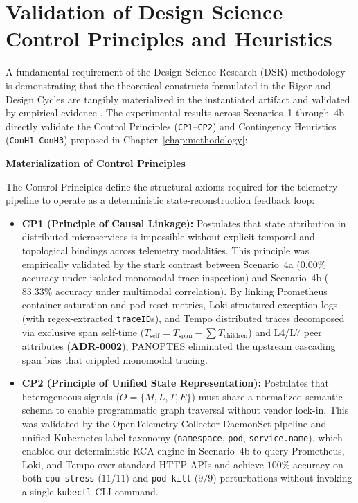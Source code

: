 \section{Validation of Design Science Control Principles and Heuristics}
\label{sec:dsr-validation}

A fundamental requirement of the Design Science Research (DSR) methodology is demonstrating that the theoretical constructs formulated in the Rigor and Design Cycles are tangibly materialized in the instantiated artifact and validated by empirical evidence \cite{hevner_2004, gregor_2013}. The experimental results across Scenarios~1 through~4b directly validate the Control Principles (\texttt{CP1}--\texttt{CP2}) and Contingency Heuristics (\texttt{ConH1}--\texttt{ConH3}) proposed in Chapter~\ref{chap:methodology}:

\textbf{Materialization of Control Principles}

The Control Principles define the structural axioms required for the telemetry pipeline to operate as a deterministic state-reconstruction feedback loop:

\begin{itemize}
    \item \textbf{CP1 (Principle of Causal Linkage):} Postulates that state attribution in distributed microservices is impossible without explicit temporal and topological bindings across telemetry modalities. This principle was empirically validated by the stark contrast between Scenario~4a ($0.00\%$ accuracy under isolated monomodal trace inspection) and Scenario~4b ($83.33\%$ accuracy under multimodal correlation). By linking Prometheus container saturation and pod-reset metrics, Loki structured exception logs (with regex-extracted \texttt{traceID}s), and Tempo distributed traces decomposed via exclusive span self-time ($T_{\text{self}} = T_{\text{span}} - \sum T_{\text{children}}$) and L4/L7 peer attributes (\textbf{ADR-0002}), PANOPTES eliminated the upstream cascading span bias that crippled monomodal tracing.
    
    \item \textbf{CP2 (Principle of Unified State Representation):} Postulates that heterogeneous signals ($O = \{M, L, T, E\}$) must share a normalized semantic schema to enable programmatic graph traversal without vendor lock-in. This was validated by the OpenTelemetry Collector DaemonSet pipeline and unified Kubernetes label taxonomy (\texttt{namespace}, \texttt{pod}, \texttt{service.name}), which enabled our deterministic RCA engine in Scenario~4b to query Prometheus, Loki, and Tempo over standard HTTP APIs and achieve $100\%$ accuracy on both \texttt{cpu-stress} ($11/11$) and \texttt{pod-kill} ($9/9$) perturbations without invoking a single \texttt{kubectl} CLI command.
\end{itemize}

